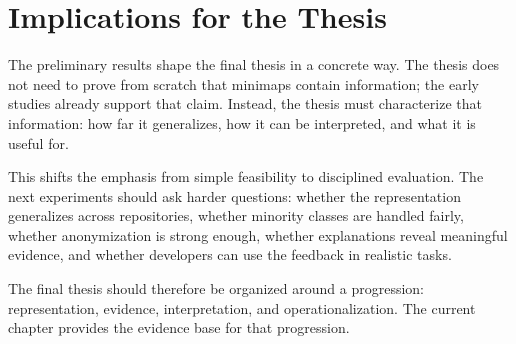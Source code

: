 \section{Implications for the Thesis}

The preliminary results shape the final thesis in a concrete way. The thesis
does not need to prove from scratch that minimaps contain information; the early
studies already support that claim. Instead, the thesis must characterize that
information: how far it generalizes, how it can be interpreted, and what it is
useful for.

This shifts the emphasis from simple feasibility to disciplined evaluation. The
next experiments should ask harder questions: whether the representation
generalizes across repositories, whether minority classes are handled fairly,
whether anonymization is strong enough, whether explanations reveal meaningful
evidence, and whether developers can use the feedback in realistic tasks.

The final thesis should therefore be organized around a progression:
representation, evidence, interpretation, and operationalization. The current
chapter provides the evidence base for that progression.
